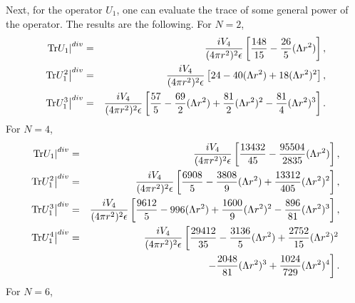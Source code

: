 \documentclass[a4paper,aps,preprint,groupedaddress,showpacs]{revtex4}
\begin{document}
Next, for the operator $U_{1}$, one can evaluate the trace of some
general power of the operator. The results are the following.
For $N=2$,
\begin{eqnarray}
\left.{\rm Tr}U_{1}\right\vert^{div}&=&
\frac{iV_{4}}{(4\pi r^{2})^{2}\epsilon}
\left[\frac{148}{15}-\frac{26}{5}(\Lambda r^{2})\right],
\\
\left.{\rm Tr}U_{1}^{2}\right\vert^{div}&=&
\frac{iV_{4}}{(4\pi r^{2})^{2}\epsilon}
\left[24-40(\Lambda r^{2})+18(\Lambda r^{2})^{2}\right],
\\
\left.{\rm Tr}U_{1}^{3}\right\vert^{div}&=&
\frac{iV_{4}}{(4\pi r^{2})^{2}\epsilon}
\left[\frac{57}{5}-\frac{69}{2}(\Lambda r^{2})+
\frac{81}{2}(\Lambda r^{2})^{2}-\frac{81}{4}(\Lambda r^{2})^{3}
\right].
\end{eqnarray}
For $N=4$,
\begin{eqnarray}
\left.{\rm Tr}U_{1}\right\vert^{div}&=&
\frac{iV_{4}}{(4\pi r^{2})^{2}\epsilon}
\left[\frac{13432}{45}-\frac{95504}{2835}(\Lambda r^{2})\right],
\\
\left.{\rm Tr}U_{1}^{2}\right\vert^{div}&=&
\frac{iV_{4}}{(4\pi r^{2})^{2}\epsilon}
\left[\frac{6908}{5}-
\frac{3808}{9}(\Lambda r^{2})+
\frac{13312}{405}(\Lambda r^{2})^{2}\right],
\\
\left.{\rm Tr}U_{1}^{3}\right\vert^{div}&=&
\frac{iV_{4}}{(4\pi r^{2})^{2}\epsilon}
\left[\frac{9612}{5}-996(\Lambda r^{2})+
\frac{1600}{9}(\Lambda r^{2})^{2}-
\frac{896}{81}(\Lambda r^{2})^{3}
\right],
\\
\left.{\rm Tr}U_{1}^{4}\right\vert^{div}&=&
\frac{iV_{4}}{(4\pi r^{2})^{2}\epsilon}
\left[\frac{29412}{35}-
\frac{3136}{5}(\Lambda r^{2})+
\frac{2752}{15}(\Lambda r^{2})^{2}\right.
\nonumber\\
&&\ \ \left.-
\frac{2048}{81}(\Lambda r^{2})^{3}+
\frac{1024}{729}(\Lambda r^{2})^{4}
\right].
\end{eqnarray}
For $N=6$,
\end{document}
